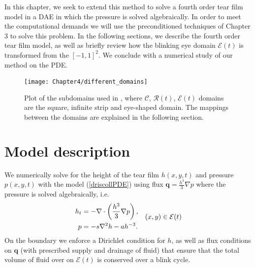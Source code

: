 In this chapter, we seek to extend this method to solve a fourth order tear film model in a DAE in which the pressure is solved algebraically. In order to meet the computational demands we will use the preconditioned techniques of Chapter 3 to solve this problem. In the following sections, we describe the fourth order tear film model, as well as briefly review how the blinking eye domain $\mathcal{E}(t)$ is transformed from the $[-1,1]^2$. We conclude with a numerical study of our method on the PDE.


\begin{figure}
  \centering
  \texttt{[image: Chapter4/different\_domains]}
  \caption{Plot of the subdomains used in \cite{driscoll2018simulation}, where $\mathcal{C}$, $\mathcal{R}(t)$, $\mathcal{E}(t)$ domains are the square, infinite strip and eye-shaped domain. The mappings between the domains are explained in the following section.}
  \label{driscoll_eye}
\end{figure}
	
\section{Model description}

We numerically solve for the height of the tear film $h(x,y,t)$ and pressure $p(x,y,t)$ with the model (\ref{driscollPDE}) using flux $\bm{q} =  \frac{h^3}{3} \nabla p$ where the pressure is solved algebraically, i.e.
\begin{align}
\begin{aligned}
h_t &= - \nabla \cdot \left( \frac{h^3}{3} \nabla p \right), \\
p &= - s \nabla^2 h - a h^{-3}.
\end{aligned} \quad (x,y) \in \mathcal{E}(t)
\label{the_pde}
\end{align}
On the boundary we enforce a Dirichlet condition for $h$, as well as flux conditions on $\bm{q}$ (with prescribed supply and drainage of fluid) that ensure that the total volume of fluid over on $\mathcal{E}(t)$ is conserved over a blink cycle.

